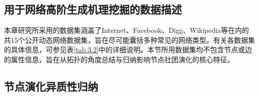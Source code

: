\subsection{用于网络高阶生成机理挖掘的数据描述}


本章研究所采用的数据集涵盖了Internet、Facebook、Digg、Wikipedia等在内的共15个公开动态网络数据集，旨在尽可能囊括多种常见的网络类型。有关各数据集的具体信息，可参见表\ref{tab.3.2}中的详细说明。本节所用数据集均不包含节点或边的属性信息，旨在从拓扑的角度总结与归纳影响节点社团演化的核心特征。






\subsection{节点演化异质性归纳}



